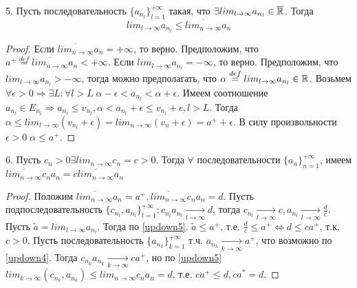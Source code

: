 \documentclass[main]{subfiles}
\begin{document}
\begin{theorem}\label{updown5}
    5. Пусть последовательность $\{a_{n_l}\}_{l=1}^{+\infty}$ такая, что 
    $\exists lim_{l\to\infty}a_{n_l} \in \overline{\mathbb{R}}$. Тогда 
    \begin{equation*}
        lim_{l\to\infty}a_{n_l} \leq \overline{lim_{n\to\infty}}a_n
    \end{equation*}
\end{theorem}
\begin{proof}
    Если $\overline{lim_{n\to\infty}}a_n = +\infty$, то верно. 
    Предположим, что $a^+ \overset{def}{=} \overline{lim_{n\to\infty}}a_n < 
    +\infty$. Если $lim_{l\to\infty}a_{n_l} = -\infty$, то верно.
    Предположим, что $lim_{l\to\infty}a_{n_l} > -\infty$, тогда можно
    предполагать, что $\alpha \overset{def}{=} lim_{l\to\infty}a_{n_l} \in \mathbb{R}$.
    Возьмем $\forall \epsilon > 0 \Rightarrow \exists L : \forall l > L \; 
    \alpha - \epsilon < a_{n_l} < \alpha + \epsilon$. Имеем соотношение
    $a_{n_l} \in E_{n_l} \Rightarrow a_{n_l} \leq v_{n_l}, \alpha < a_{n_l} +
    \epsilon \leq v_{n_l} + \epsilon, l > L$. Тогда 
    $\alpha \leq  lim_{l\to\infty}(v_{n_l} + \epsilon) =
    lim_{n\to\infty}(v_{n} + \epsilon) = a^+ + \epsilon$.
    В силу произвольности $\epsilon > 0 \; \alpha \leq a^+$.
\end{proof}

\begin{theorem}\label{updown6}
    6. Пусть $c_n > 0 \exists lim_{n\to\infty}c_n = c > 0$. Тогда $\forall$
    последовательности $\{a_n\}_{n=1}^{+\infty}$, имеем 
    $\overline{lim_{n\to\infty}}c_na_n = c\overline{lim_{n\to\infty}}a_n$
\end{theorem}
\begin{proof}
    Положим $\overline{lim_{n\to\infty}}a_n = a^+, 
    \overline{lim_{n\to\infty}}c_na_n = d$. Пусть подпоследовательность 
    $\{c_{n_l}, a_{n_l}\}_{l=1}^{+\infty} : c_{n_l}a_{n_l} \underset{l\to\infty}{\to} d$,
    тогда $c_{n_l} \underset{l\to\infty}{\to} c, a_{n_l} \underset{l\to\infty}{\to} 
    \frac{d}{c}$. Пусть $\widetilde{a} = lim_{l\to\infty}a_{n_l}$. 
    Тогда по \ref{updown5}. $\widetilde{a} \leq a^+$, т.е. $\frac{d}{c} \leq
    a^+ \Leftrightarrow d \leq ca^+$, т.к. $c > 0$.
    Пусть последовательность $\{a_{n_k}\}_{k=1}^{+\infty}$ т.ч. $a_{n_k} 
    \underset{k\to\infty}{\to} a^+$, что возможно по \ref{updown4}. Тогда 
    $c_{n_k}a_{n_k} \underset{k\to\infty}{\to} ca^+$, но по \ref{updown5}
    $lim_{k\to\infty}(c_{n_k}, a_{n_k}) \leq \overline{lim_{n\to\infty}}c_na_n = d$,
    т.е. $ca^+ \leq d, ca^* = d$.
\end{proof}
\end{document}
